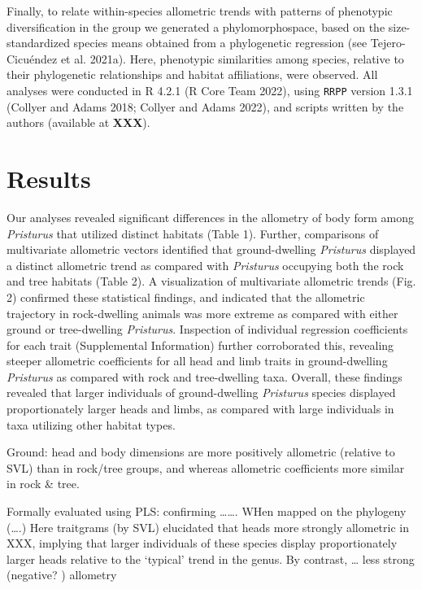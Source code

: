\documentclass[
]{article}
\begin{document}
Finally, to relate within-species allometric trends with patterns of
phenotypic diversification in the group we generated a phylomorphospace,
based on the size-standardized species means obtained from a
phylogenetic regression (see Tejero-Cicuéndez et al. 2021a). Here,
phenotypic similarities among species, relative to their phylogenetic
relationships and habitat affiliations, were observed. All analyses were
conducted in R 4.2.1 (R Core Team 2022), using \texttt{RRPP} version
1.3.1 (Collyer and Adams 2018; Collyer and Adams 2022), and scripts
written by the authors (available at \textbf{XXX}).

\hypertarget{results}{%
\section{Results}\label{results}}

Our analyses revealed significant differences in the allometry of body
form among \emph{Pristurus} that utilized distinct habitats (Table 1).
Further, comparisons of multivariate allometric vectors identified that
ground-dwelling \emph{Pristurus} displayed a distinct allometric trend
as compared with \emph{Pristurus} occupying both the rock and tree
habitats (Table 2). A visualization of multivariate allometric trends
(Fig. 2) confirmed these statistical findings, and indicated that the
allometric trajectory in rock-dwelling animals was more extreme as
compared with either ground or tree-dwelling \emph{Pristurus}.
Inspection of individual regression coefficients for each trait
(Supplemental Information) further corroborated this, revealing steeper
allometric coefficients for all head and limb traits in ground-dwelling
\emph{Pristurus} as compared with rock and tree-dwelling taxa. Overall,
these findings revealed that larger individuals of ground-dwelling
\emph{Pristurus} species displayed proportionately larger heads and
limbs, as compared with large individuals in taxa utilizing other
habitat types. \hfill\break

Ground: head and body dimensions are more positively allometric
(relative to SVL) than in rock/tree groups, and whereas allometric
coefficients more similar in rock \& tree.

Formally evaluated using PLS: confirming \ldots\ldots. WHen mapped on
the phylogeny (\ldots.) Here traitgrams (by SVL) elucidated that heads
more strongly allometric in XXX, implying that larger individuals of
these species display proportionately larger heads relative to the
`typical' trend in the genus. By contrast, \ldots{} less strong
(negative? ) allometry
\end{document}
